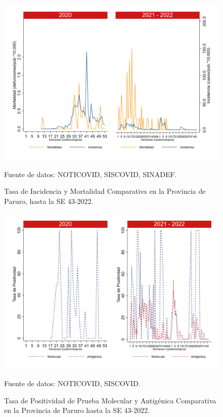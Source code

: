 \documentclass[12pt,a4paper,openany]{book}
\begin{document}
	\begin{figure}[h]
		\caption{Tasa de Incidencia y Mortalidad Comparativa en la Provincia de Paruro, hasta la SE 43-2022.}\label{fig:inc_mort_paruro}
		\begin{center}
			\includegraphics[width=0.85\linewidth]{../figuras/incidencia_mortalidad_20_21_10.png}
		\end{center}
		{\footnotesize {Fuente de datos: NOTICOVID, SISCOVID, SINADEF.}} 
	\end{figure}
	
	\begin{figure}[h]
		\caption{Tasa de Positividad de Prueba Molecular y Antigénica Comparativa en la Provincia de Paruro hasta la SE 43-2022.}\label{fig:positividad_paruro}
		\begin{center}
			\includegraphics[width=0.7\linewidth]{../figuras/positividad_20_21_10.png}
		\end{center}
		{\footnotesize {Fuente de datos: NOTICOVID, SISCOVID.}}
	\end{figure}
	
\end{document}
